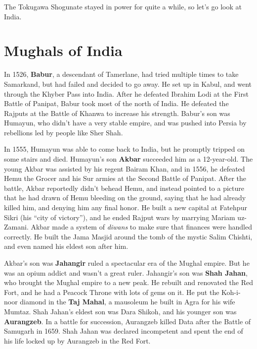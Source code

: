 The Tokugawa Shogunate stayed in power for quite a while, so let's go look at India.

\section{Mughals of India}

In 1526, \textbf{Babur}, a descendant of Tamerlane,
had tried multiple times to take Samarkand, but had failed and decided to go away.
He set up in Kabul, and went through the Khyber Pass into India.
After he defeated Ibrahim Lodi at the First Battle of Panipat, Babur took most of the north of India.
He defeated the Rajputs at the Battle of Khanwa to increase his strength.
Babur's son was Humayun, who didn't have a very stable empire,
and was pushed into Persia by rebellions led by people like Sher Shah.

In 1555, Humayun was able to come back to India, but he promptly tripped on some stairs and died.
Humayun's son \textbf{Akbar} succeeded him as a 12-year-old.
The young Akbar was assisted by his regent Bairam Khan,
and in 1556, he defeated Hemu the Grocer and his Sur armies at the Second Battle of Panipat.
After the battle, Akbar reportedly didn't behead Hemu,
and instead pointed to a picture that he had drawn of Hemu bleeding on the ground,
saying that he had already killed him, and denying him any final honor.
He built a new capital at Fatehpur Sikri (his ``city of victory''),
and he ended Rajput wars by marrying Mariam uz-Zamani.
Akbar made a system of \textit{diwans} to make sure that finances were handled correctly.
He built the Jama Masjid around the tomb of the mystic Salim Chishti,
and even named his eldest son after him.

Akbar's son was \textbf{Jahangir} ruled a spectacular era of the Mughal empire.
But he was an opium addict and wasn't a great ruler.
Jahangir's son was \textbf{Shah Jahan}, who brought the Mughal empire to a new peak.
He rebuilt and renovated the Red Fort, and he had a Peacock Throne with lots of gems on it.
He put the Koh-i-noor diamond in the \textbf{Taj Mahal}, a mausoleum he built in Agra for his wife Mumtaz.
Shah Jahan's eldest son was Dara Shikoh, and his younger son was \textbf{Aurangzeb}.
In a battle for succession, Aurangzeb killed Data after the Battle of Samugarh in 1659.
Shah Jahan was declared incompetent and spent the end of his life locked up by Aurangzeb in the Red Fort.
